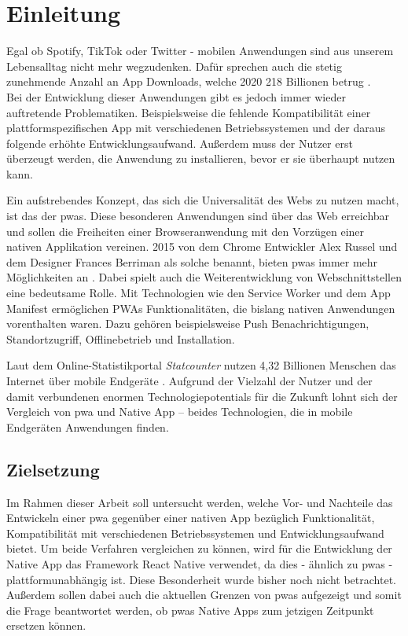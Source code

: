 \chapter{Einleitung}\label{ch:intro}
Egal ob Spotify, TikTok oder Twitter - mobilen Anwendungen sind aus unserem Lebensalltag nicht mehr wegzudenken.
Dafür sprechen auch die stetig zunehmende Anzahl an App Downloads, welche 2020 218 Billionen betrug \cite{Iqbal.06.05.2021}.\\
Bei der Entwicklung dieser Anwendungen gibt es jedoch immer wieder auftretende Problematiken.
Beispielsweise die fehlende Kompatibilität einer plattformspezifischen App mit verschiedenen Betriebssystemen und der daraus folgende erhöhte Entwicklungsaufwand.
Außerdem muss der Nutzer erst überzeugt werden, die Anwendung zu installieren, bevor er sie überhaupt nutzen kann.

Ein aufstrebendes Konzept, das sich die Universalität des Webs zu nutzen macht, ist das der \acp{pwa}.
Diese besonderen Anwendungen sind über das Web erreichbar und sollen die Freiheiten einer Browseranwendung mit den Vorzügen einer nativen Applikation vereinen.
2015 von dem Chrome Entwickler Alex Russel und dem Designer Frances Berriman als solche benannt, bieten \acp{pwa} immer mehr Möglichkeiten an \cite{Russell.2015}.
Dabei spielt auch die Weiterentwicklung von Webschnittstellen eine bedeutsame Rolle.
Mit Technologien wie den Service Worker und dem App Manifest ermöglichen PWAs Funktionalitäten, die bislang nativen Anwendungen vorenthalten waren.
Dazu gehören beispielsweise Push Benachrichtigungen, Standortzugriff, Offlinebetrieb und Installation.

Laut dem Online-Statistikportal \textit{Statcounter} nutzen 4,32 Billionen Menschen das Internet über mobile Endgeräte \cite{StatCounter.2021}.
Aufgrund der Vielzahl der Nutzer und der damit verbundenen enormen Technologiepotentials für die Zukunft lohnt sich der Vergleich von \ac{pwa} und Native App – beides Technologien, die in mobile Endgeräten Anwendungen finden. 

\section{Zielsetzung}
Im Rahmen dieser Arbeit soll untersucht werden, welche Vor- und Nachteile das Entwickeln einer \ac{pwa} gegenüber einer nativen App bezüglich Funktionalität, Kompatibilität mit verschiedenen Betriebssystemen und Entwicklungsaufwand bietet.
Um beide Verfahren vergleichen zu können, wird für die Entwicklung der Native App das Framework React Native verwendet, da dies - ähnlich zu \acp{pwa} - plattformunabhängig ist.
Diese Besonderheit wurde bisher noch nicht betrachtet. %
Außerdem sollen dabei auch die aktuellen Grenzen von \acp{pwa} aufgezeigt und somit die Frage beantwortet werden, ob \acp{pwa} Native Apps zum jetzigen Zeitpunkt ersetzen können.

